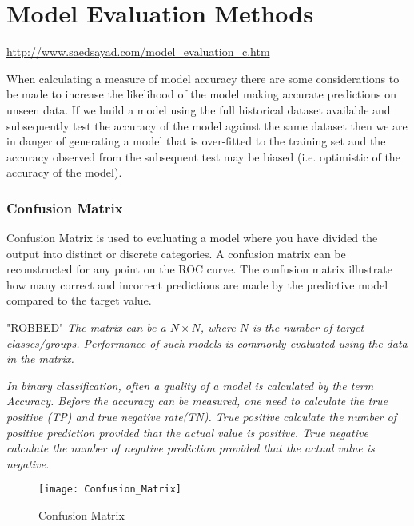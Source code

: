 \section{Model Evaluation Methods}\label{modelEval}

\url{http://www.saedsayad.com/model_evaluation_c.htm}


When calculating a measure of model accuracy there are some considerations to be made to increase the likelihood of the model making accurate predictions on unseen data. If we build a model using the full historical dataset available and subsequently test the accuracy of the model against the same dataset then we are in danger of generating a model that is over-fitted to the training set and the accuracy observed from the subsequent test may be biased (i.e. optimistic of the accuracy of the model).

\subsubsection{Confusion Matrix}

Confusion Matrix is used to evaluating a model where you have divided the output into distinct or discrete categories. A confusion matrix can be reconstructed for any point on the ROC curve. The confusion matrix illustrate how many correct and incorrect predictions are made by the predictive model compared to the target value. 

"ROBBED" \textit{The matrix can be a $N \times N$, where $N$ is the number of target classes/groups. Performance of such models is commonly evaluated using the data in the matrix.}

\textit{In binary classification, often a quality of a model is calculated by the term Accuracy. Before the accuracy can be measured, one need to calculate the true positive (TP) and true negative rate(TN). True positive calculate the number of positive prediction provided that the actual value is positive. True negative calculate the number of negative prediction provided that the actual value is negative.}

\begin{figure}[H]
	\texttt{[image: Confusion\_Matrix]}
	\caption[Confusion Matrix]
	{Confusion Matrix}
	\label{fig:ConfusionMatrix}
\end{figure}

